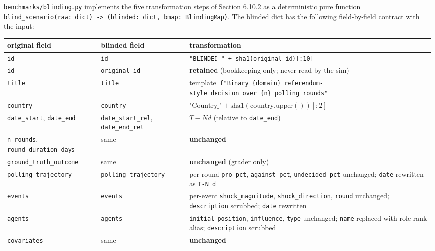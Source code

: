 \documentclass[
]{article}
\begin{document}
\texttt{benchmarks/blinding.py} implements the five transformation steps
of Section 6.10.2 as a deterministic pure function
\texttt{blind\_scenario(raw:\ dict)\ -\textgreater{}\ (blinded:\ dict,\ bmap:\ BlindingMap)}.
The blinded dict has the following field-by-field contract with the
input:

\begin{longtable}[]{@{}
  >{\raggedright\arraybackslash}p{}
  >{\raggedright\arraybackslash}p{}
  >{\raggedright\arraybackslash}p{}@{}}
\toprule\noalign{}
\begin{minipage}[b]{\linewidth}\raggedright
original field
\end{minipage} & \begin{minipage}[b]{\linewidth}\raggedright
blinded field
\end{minipage} & \begin{minipage}[b]{\linewidth}\raggedright
transformation
\end{minipage} \\
\midrule\noalign{}
\endhead
\bottomrule\noalign{}
\endlastfoot
\texttt{id} & \texttt{id} &
\texttt{"BLINDED\_"\ +\ sha1(original\_id){[}:10{]}} \\
\texttt{id} & \texttt{original\_id} & \textbf{retained} (bookkeeping
only; never read by the sim) \\
\texttt{title} & \texttt{title} & template:
\texttt{f"Binary\ \{domain\}\ referendum-style\ decision\ over\ \{n\}\ polling\ rounds"} \\
\texttt{country} & \texttt{country} &
\(\text{"Country\_"} + \text{sha1}(\text{country}.\text{upper}())[:2]\) \\
\texttt{date\_start}, \texttt{date\_end} & \texttt{date\_start\_rel},
\texttt{date\_end\_rel} & \(T - N d\) (relative to
\texttt{date\_end}) \\
\texttt{n\_rounds}, \texttt{round\_duration\_days} & same &
\textbf{unchanged} \\
\texttt{ground\_truth\_outcome} & same & \textbf{unchanged} (grader
only) \\
\texttt{polling\_trajectory} & \texttt{polling\_trajectory} & per-round
\texttt{pro\_pct}, \texttt{against\_pct}, \texttt{undecided\_pct}
unchanged; \texttt{date} rewritten as \texttt{T-N\ d} \\
\texttt{events} & \texttt{events} & per-event \texttt{shock\_magnitude},
\texttt{shock\_direction}, \texttt{round} unchanged;
\texttt{description} scrubbed; \texttt{date} rewritten \\
\texttt{agents} & \texttt{agents} & \texttt{initial\_position},
\texttt{influence}, \texttt{type} unchanged; \texttt{name} replaced with
role-rank alias; \texttt{description} scrubbed \\
\texttt{covariates} & same & \textbf{unchanged} \\
\end{longtable}
\end{document}
